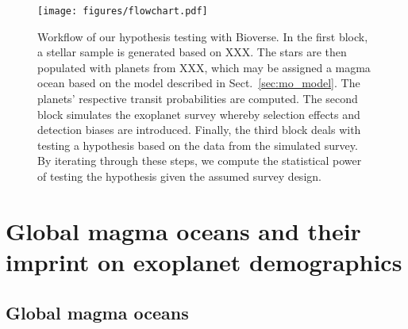 \documentclass[modern]{aastex631}
\begin{document}
\begin{figure}
    \begin{centering}
        \texttt{[image: figures/flowchart.pdf]}
        \caption{Workflow of our hypothesis testing with Bioverse. In the first block, a stellar sample is generated based on XXX. The stars are then populated with planets from XXX, which may be assigned a magma ocean based on the model described in Sect.~\ref{sec:mo_model}. The planets' respective transit probabilities are computed. The second block simulates the exoplanet survey whereby selection effects and detection biases are introduced. Finally, the third block deals with testing a hypothesis based on the data from the simulated survey. By iterating through these steps, we compute the statistical power of testing the hypothesis given the assumed survey design.}
        \label{fig:flowchart}
    \end{centering}
\end{figure}


\section{Global magma oceans and their imprint on exoplanet demographics}
\subsection{Global magma oceans}
\end{document}
